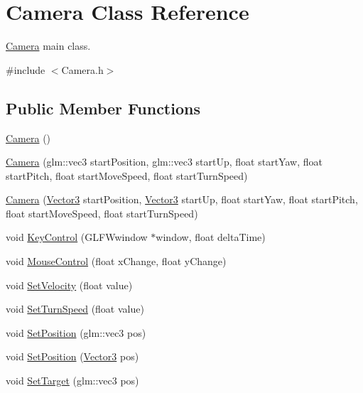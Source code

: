 \hypertarget{class_camera}{}\section{Camera Class Reference}
\label{class_camera}


\mbox{\hyperlink{class_camera}{Camera}} main class.  




{\ttfamily \#include $<$Camera.\+h$>$}

\subsection*{Public Member Functions}
\begin{DoxyCompactItemize}
\item 
\mbox{\hyperlink{class_camera_a01f94c3543f56ede7af49dc778f19331}{Camera}} ()
\item 
\mbox{\hyperlink{class_camera_a5fb61ac7fc737a2c72fb49420da383d0}{Camera}} (glm\+::vec3 start\+Position, glm\+::vec3 start\+Up, float start\+Yaw, float start\+Pitch, float start\+Move\+Speed, float start\+Turn\+Speed)
\item 
\mbox{\hyperlink{class_camera_aa8a2b461866b2924071e4eb10c43a635}{Camera}} (\mbox{\hyperlink{struct_vector3}{Vector3}} start\+Position, \mbox{\hyperlink{struct_vector3}{Vector3}} start\+Up, float start\+Yaw, float start\+Pitch, float start\+Move\+Speed, float start\+Turn\+Speed)
\item 
void \mbox{\hyperlink{class_camera_a68dfb40f9e073eafb27c40549c3501a6}{Key\+Control}} (G\+L\+F\+Wwindow $\ast$window, float delta\+Time)
\item 
void \mbox{\hyperlink{class_camera_a3d5110ad37f5d75dd278ece789841d38}{Mouse\+Control}} (float x\+Change, float y\+Change)
\item 
void \mbox{\hyperlink{class_camera_abbfbdc1eb2ffd6e250894b6d73bb6d1c}{Set\+Velocity}} (float value)
\item 
void \mbox{\hyperlink{class_camera_af596e4ca38674668374a4486cbeb8c00}{Set\+Turn\+Speed}} (float value)
\item 
void \mbox{\hyperlink{class_camera_abe0e64d3ac0eedeedc821e0f4a1e0367}{Set\+Position}} (glm\+::vec3 pos)
\item 
void \mbox{\hyperlink{class_camera_a29b98609f90350c109ea8b5da97ed283}{Set\+Position}} (\mbox{\hyperlink{struct_vector3}{Vector3}} pos)
\item 
void \mbox{\hyperlink{class_camera_a0b99b533cd3fb1fd194f824fb598d7d7}{Set\+Target}} (glm\+::vec3 pos)

\end{DoxyCompactItemize}
